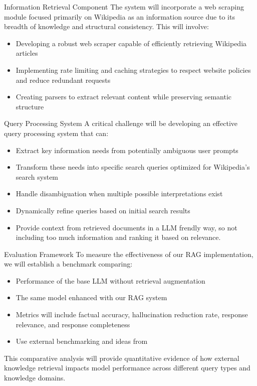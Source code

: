 \documentclass[fleqn,moreauthors,10pt]{ds_report}
\begin{document}
Information Retrieval Component
The system will incorporate a web scraping module focused primarily on Wikipedia as an information source due to its breadth of knowledge and structural consistency. This will involve:

\begin{itemize}[itemsep=0em]
\item Developing a robust web scraper capable of efficiently retrieving Wikipedia articles
\item Implementing rate limiting and caching strategies to respect website policies and reduce redundant requests
\item Creating parsers to extract relevant content while preserving semantic structure
\end{itemize}

Query Processing System
A critical challenge will be developing an effective query processing system that can:

\begin{itemize}[itemsep=0em]
\item Extract key information needs from potentially ambiguous user prompts
\item Transform these needs into specific search queries optimized for Wikipedia's search system
\item Handle disambiguation when multiple possible interpretations exist
\item Dynamically refine queries based on initial search results
\item Provide context from retrieved documents in a LLM frendly way, so not including too much information and ranking it based on relevance.
\end{itemize}

Evaluation Framework
To measure the effectiveness of our RAG implementation, we will establish a benchmark comparing:

\begin{itemize}[itemsep=0em]
\item Performance of the base LLM without retrieval augmentation
\item The same model enhanced with our RAG system
\item Metrics will include factual accuracy, hallucination reduction rate, response relevance, and response completeness
\item Use external benchmarking and ideas from \cite{chen} 
\end{itemize}

This comparative analysis will provide quantitative evidence of how external knowledge retrieval impacts model performance across different query types and knowledge domains.
\end{document}
